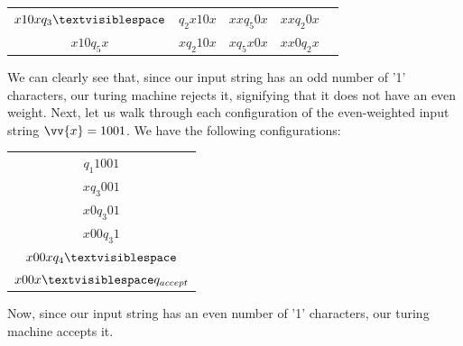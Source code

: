 \documentclass{article}
\begin{document}
\begin{exmp}
\begin{center}
\begin{tabular}{ c c c c c }
	$x10xq_{3}\textvisiblespace$ & $q_{2}x10x$ & $xxq_{5}0x$ & $xxq_{2}0x$ \\
	$x10q_{5}x$ & $xq_{2}10x$ & $xq_{5}x0x$ & $xx0q_{2}x$
\end{tabular}
\end{center}
\noindent We can clearly see that, since our input string has an odd number of '1' characters, our turing machine rejects it, signifying that it does not have an even weight.  Next, let us walk through each configuration of the even-weighted input string $\vv{x} = 1001$.  We have the following configurations:
\begin{center}
\begin{tabular}{ c }
	$q_{1}1001$ \\
	$xq_{3}001$ \\
	$x0q_{3}01$ \\
	$x00q_{3}1$ \\
	$x00xq_{4}\textvisiblespace$ \\
	$x00x\textvisiblespace q_{accept}$
\end{tabular}
\end{center}
\end{exmp}
\noindent Now, since our input string has an even number of '1' characters, our turing machine accepts it. \cite{2}
\end{document}
